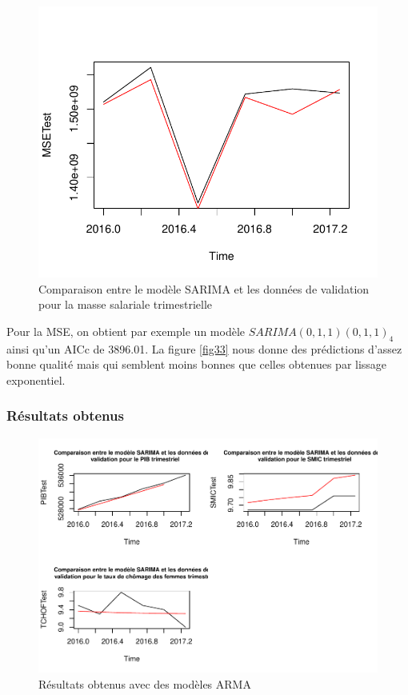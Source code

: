 \documentclass[11pt,]{article}
\begin{document}
\begin{figure}

{\centering \includegraphics{doc_files/figure-latex/unnamed-chunk-55-1} 

}

\caption{\label{fig33} Comparaison entre le modèle SARIMA et les données de validation pour la masse salariale trimestrielle}\label{fig:unnamed-chunk-55}
\end{figure}

Pour la MSE, on obtient par exemple un modèle \(SARIMA(0,1,1)(0,1,1)_4\)
ainsi qu'un AICc de 3896.01. La figure \ref{fig33} nous donne des
prédictions d'assez bonne qualité mais qui semblent moins bonnes que
celles obtenues par lissage exponentiel.

\subsubsection{Résultats obtenus}\label{resultats-obtenus-1}

\begin{figure}[htbp]
\centering
\includegraphics{doc_files/figure-latex/unnamed-chunk-57-1.pdf}
\caption{\label{fig34} Résultats obtenus avec des modèles ARMA}
\end{figure}
\end{document}
